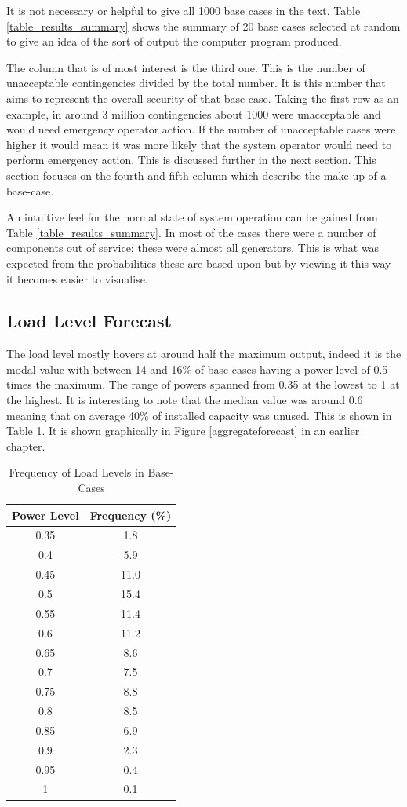 \documentclass[a4paper,oneside,12pt]{report}
\begin{document}
It is not necessary or helpful to give all 1000 base cases in the text. Table \ref{table_results_summary} shows the summary of 20 base cases selected at random to give an idea of the sort of output the computer program produced.

The column that is of most interest is the third one. This is the number of unacceptable contingencies divided by the total number. It is this number that aims to represent the overall security of that base case. Taking the first row as an example, in around 3 million contingencies about 1000 were unacceptable and would need emergency operator action. If the number of unacceptable cases were higher it would mean it was more likely that the system operator would need to perform emergency action. This is discussed further in the next section. This section focuses on the fourth and fifth column which describe the make up of a base-case.

An intuitive feel for the normal state of system operation can be gained from Table  \ref{table_results_summary}. In most of the cases there were a number of components out of service; these were almost all generators. This is what was expected from the probabilities these are based upon but by viewing it this way it becomes easier to visualise. 

\subsection{Load Level Forecast}

The load level mostly hovers at around half the maximum output, indeed it is the modal value with between 14 and 16\% of base-cases having a power level of 0.5 times the maximum. The range of powers spanned from 0.35 at the lowest to 1 at the highest. It is interesting to note that the median value was around 0.6 meaning that on average 40\% of installed capacity was unused. This is shown in Table \ref{table_load_levels}. It is shown graphically in Figure \ref{aggregateforecast} in an earlier chapter.

\begin{table}[htbp]
\caption{Frequency of Load Levels in Base-Cases}
\label{table_load_levels}
\centering
\begin{tabular}{c||c}
\bfseries Power Level & \bfseries Frequency (\%) \\
\hline \hline
0.35 & 1.8 \\ 
0.4 & 5.9 \\ 
0.45 & 11.0 \\ 
0.5 & 15.4 \\ 
0.55 & 11.4 \\ 
0.6 & 11.2 \\ 
0.65 & 8.6 \\ 
0.7 & 7.5 \\ 
0.75 & 8.8 \\ 
0.8 & 8.5 \\ 
0.85 & 6.9 \\ 
0.9 & 2.3 \\ 
0.95 & 0.4 \\ 
1 & 0.1 \\ 
\hline
\end{tabular}\\
\end{table}
\end{document}
